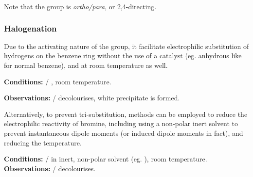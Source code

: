			Note that the  group is \textit{ortho/para}, or 2,4-directing.

			\pagebreak
			\subsubsection{Halogenation}

				Due to the activating nature of the  group, it facilitate electrophilic substitution of hydrogens on the benzene ring
				without the use of a catalyst (eg. anhydrous  like for normal benzene), and at room temperature as well.


				\vspace{1.5em}
				\vbox{\textbf{Conditions:}	\tabto{35mm} / \ch{\chlorine 2 \stAq}, room temperature.}

				\vspace{0.75em}
				\vbox{\textbf{Observations:}\tabto{35mm}  /   decolourises,			\tabto{35mm}white precipitate is formed.}



				Alternatively, to prevent tri-substitution, methods can be employed to reduce the electrophilic reactivity of bromine, including
				using a non-polar inert solvent to prevent instantaneous dipole moments (or induced dipole moments in fact), and reducing
				the temperature.



				\vspace{1.5em}
				\vbox{\textbf{Conditions:}	\tabto{35mm} / \ch{\chlorine 2 \stG} in inert, non-polar solvent (eg. ), room temperature.}
				\vbox{\textbf{Observations:}\tabto{35mm}  /   decolourises.}




